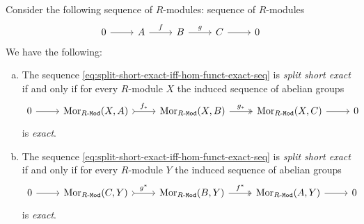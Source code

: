 \begin{lemma}
    \label{lem:split-short-exact-iff-hom-funct-exact-seq}
    Consider the following sequence of \(R\)-modules: sequence of \(R\)-modules
    \begin{equation}\label{eq:split-short-exact-iff-hom-funct-exact-seq}
        \begin{tikzcd}
            0 \ar[r]
            &A \ar[r, "f"]
            &B \ar[r, "g"]
            &C \ar[r]
            &0
        \end{tikzcd}
    \end{equation}
    We have the following:
    \begin{enumerate}[(a)]\setlength\itemsep{0em}
        \item The sequence \cref{eq:split-short-exact-iff-hom-funct-exact-seq} is
              \emph{split short exact} if and only if for every \(R\)-module \(X\) the
              induced sequence of abelian groups
              \[
                  \begin{tikzcd}
                      0 \ar[r]
                      &\Mor_{\Mod R}(X, A)
                      \ar[r, tail, "f_{*}"]
                      &\Mor_{\Mod R}(X, B)
                      \ar[r, two heads, "g_{*}"]
                      &\Mor_{\Mod R}(X, C)
                      \ar[r]
                      &0
                  \end{tikzcd}
              \]
              is \emph{exact}.

        \item The sequence \cref{eq:split-short-exact-iff-hom-funct-exact-seq} is
              \emph{split short exact} if and only if for every \(R\)-module \(Y\) the
              induced sequence of abelian groups
              \[
                  \begin{tikzcd}
                      0 \ar[r]
                      &\Mor_{\Mod R}(C, Y)
                      \ar[r, tail, "g^{*}"]
                      &\Mor_{\Mod R}(B, Y)
                      \ar[r, two heads, "f^{*}"]
                      &\Mor_{\Mod R}(A, Y)
                      \ar[r]
                      &0
                  \end{tikzcd}
              \]
              is \emph{exact}.
    \end{enumerate}
\end{lemma}

